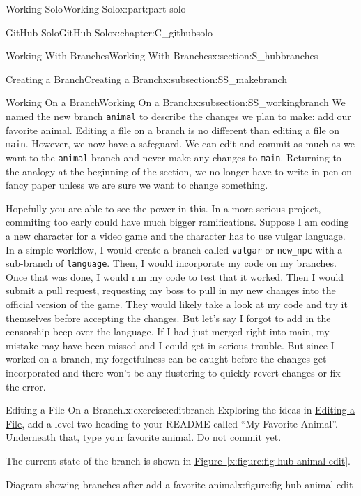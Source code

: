 \documentclass[oneside,10pt,]{book}
\newcommand{\xreffont}{\relax}
\newcommand{\mono}[1]{\texttt{#1}}
\begin{document}
\begin{partptx}{Working Solo}{}{Working Solo}{}{}{x:part:part-solo}
\begin{chapterptx}{GitHub Solo}{}{GitHub Solo}{}{}{x:chapter:C_githubsolo}
\begin{sectionptx}{Working With Branches}{}{Working With Branches}{}{}{x:section:S_hubbranches}
\begin{subsectionptx}{Creating a Branch}{}{Creating a Branch}{}{}{x:subsection:SS_makebranch}
\end{subsectionptx}
%
%
\typeout{************************************************}
\typeout{************************************************}
%
\begin{subsectionptx}{Working On a Branch}{}{Working On a Branch}{}{}{x:subsection:SS_workingbranch}
%
We named the new branch \mono{animal} to describe the changes we plan to make: add our favorite animal. Editing a file on a branch is no different than editing a file on \mono{main}. However, we now have a safeguard. We can edit and commit as much as we want to the \mono{animal} branch and never make any changes to \mono{main}. Returning to the analogy at the beginning of the section, we no longer have to write in pen on fancy paper unless we are sure we want to change something.%
\par
Hopefully you are able to see the power in this. In a more serious project, commiting too early could have much bigger ramifications. Suppose I am coding a new character for a video game and the character has to use vulgar language. In a simple workflow, I would create a branch called \mono{vulgar} or \mono{new\_npc} with a sub-branch of \mono{language}. Then, I would incorporate my code on my branches. Once that was done, I would run my code to test that it worked. Then I would submit a pull request, requesting my boss to pull in my new changes into the official version of the game. They would likely take a look at my code and try it themselves before accepting the changes. But let's say I forgot to add in the censorship beep over the language. If I had just merged right into main, my mistake may have been missed and I could get in serious trouble. But since I worked on a branch, my forgetfulness can be caught before the changes get incorporated and there won't be any flustering to quickly revert changes or fix the error.%
\begin{inlineexercise}{Editing a File On a Branch.}{x:exercise:editbranch}%
Exploring the ideas in \hyperref[x:subsection:hub-editfile]{Editing a File}, add a level two heading to your README called ``My Favorite Animal''. Underneath that, type your favorite animal. Do not commit yet.%
\par
The current state of the branch is shown in \hyperref[x:figure:fig-hub-animal-edit]{Figure~{\xreffont\ref{x:figure:fig-hub-animal-edit}}}.%
\end{inlineexercise}%
\begin{figureptx}{Diagram showing branches after add a favorite animal}{x:figure:fig-hub-animal-edit}{}%

\end{figureptx}
\end{subsectionptx}
\end{sectionptx}
\end{chapterptx}
\end{partptx}
\end{document}
